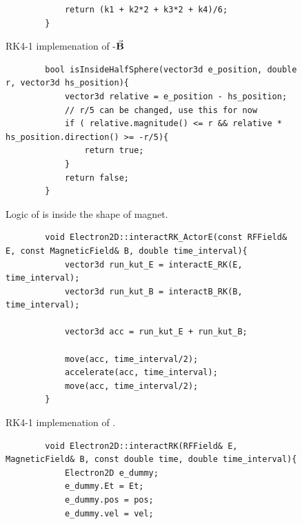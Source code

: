 \documentclass[a4paper,oneside,12pt]{report}
\numberwithin{equation}{chapter}
\begin{document}
{\begin{figure}[H]
\begin{verbatim}
            return (k1 + k2*2 + k3*2 + k4)/6;
        }
    \end{verbatim}
    \vspace{0pt}
\caption{RK4-1 implemenation of \e-$\vec{\textbf{B}}$}
\label{fig:rk1_B}
\end{figure}
\clearpage
\begin{figure}[H]
    \centering
    \begin{verbatim}
        bool isInsideHalfSphere(vector3d e_position, double r, vector3d hs_position){
            vector3d relative = e_position - hs_position;       
            // r/5 can be changed, use this for now                                
            if ( relative.magnitude() <= r && relative * hs_position.direction() >= -r/5){      
                return true;                                                                 
            }
            return false;
        }
    \end{verbatim}
    \vspace{0pt}
\caption{Logic of is \e inside the shape of magnet.}
\label{fig:is_inside_halfsphere}
\end{figure}

\vspace{5pt}
\begin{figure}[H]
    \centering
    \begin{verbatim}
        void Electron2D::interactRK_ActorE(const RFField& E, const MagneticField& B, double time_interval){
            vector3d run_kut_E = interactE_RK(E, time_interval);
            vector3d run_kut_B = interactB_RK(B, time_interval);
        
            vector3d acc = run_kut_E + run_kut_B;
            
            move(acc, time_interval/2);
            accelerate(acc, time_interval);
            move(acc, time_interval/2);
        }
    \end{verbatim}
    \vspace{0pt}
\caption{RK4-1 implemenation of \eEM.}
\label{fig:rk1_EM}
\end{figure}

\begin{figure}[H]
    \centering
    \begin{verbatim}
        void Electron2D::interactRK(RFField& E, MagneticField& B, const double time, double time_interval){
            Electron2D e_dummy;
            e_dummy.Et = Et;
            e_dummy.pos = pos;
            e_dummy.vel = vel;
    

\end{verbatim}
\end{figure}}
\end{document}
